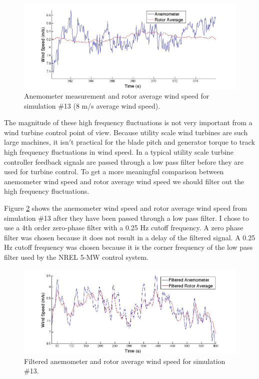 \begin{figure}[htbp]
	\centering
		\includegraphics[width = \linewidth]{Figures/ch2Figures/fig2-7.jpg}
		
	\caption{Anemometer measurement and rotor average wind speed for simulation \#13 (8 m/s average wind speed).}
	\label{fig2-7}
\end{figure}

The magnitude of these high frequency fluctuations is not very important from a wind turbine control point of view. Because utility scale wind turbines are such large machines, it isn$'$t practical for the blade pitch and generator torque to track high frequency fluctuations in wind speed. In a typical utility scale turbine controller feedback signals are passed through a low pass filter before they are used for turbine control. To get a more meaningful comparison between anemometer wind speed and rotor average wind speed we should filter out the high frequency fluctuations.

Figure \ref{fig2-8} shows the anemometer wind speed and rotor average wind speed from simulation \#13 after they have been passed through a low pass filter. I chose to use a 4th order zero-phase filter with a 0.25 Hz cutoff frequency. A zero phase filter was chosen because it does not result in a delay of the filtered signal. A 0.25 Hz cutoff frequency was chosen because it is the corner frequency of the low pass filter used by the NREL 5-MW control system. 

\begin{figure}[htbp]
	\centering
		\includegraphics[width = \linewidth]{Figures/ch2Figures/fig2-8.jpg}
		
	\caption{Filtered anemometer and rotor average wind speed for simulation \#13.}
	\label{fig2-8}
\end{figure}

